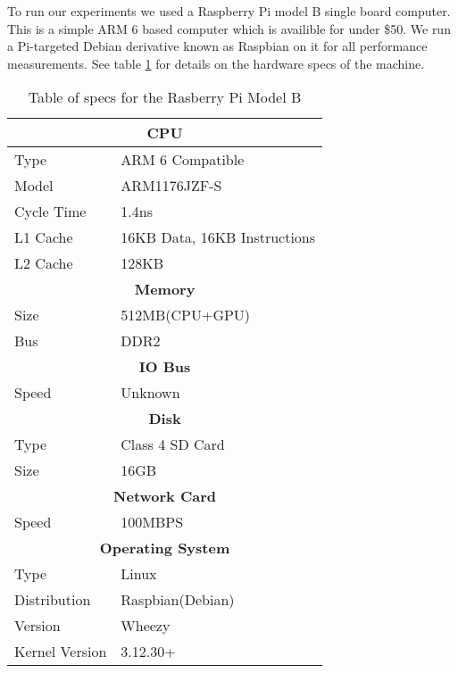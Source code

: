 To run our experiments we used a Raspberry Pi model B single board computer.   
This is a simple ARM 6 based computer which is availible for under \$50.
We run a Pi-targeted Debian derivative known as Raspbian on it for all performance measurements.
See table \ref{tbl:specs} for details on the hardware specs of the machine.

\begin{table}[h]
\centering
\begin{tabular}{|l|l|}
\hline
\multicolumn{2}{|c|}{\textbf{CPU}}              \\ \hline
Type                 & ARM 6 Compatible         \\ \hline
Model                & ARM1176JZF-S             \\ \hline
Cycle Time           & 1.4ns                    \\ \hline
L1 Cache             & 16KB Data, 16KB Instructions          \\ \hline
L2 Cache             & 128KB           \\ \hline
\multicolumn{2}{|c|}{\textbf{Memory}}           \\ \hline
Size                 & 512MB(CPU+GPU)           \\ \hline
Bus                  & DDR2                     \\ \hline
\multicolumn{2}{|c|}{\textbf{IO Bus}}           \\ \hline
Speed                & Unknown                  \\ \hline
\multicolumn{2}{|c|}{\textbf{Disk}}             \\ \hline
Type                 & Class 4 SD Card          \\ \hline
Size                 & 16GB                     \\ \hline
\multicolumn{2}{|c|}{\textbf{Network Card}}     \\ \hline
Speed                & 100MBPS                  \\ \hline
\multicolumn{2}{|c|}{\textbf{Operating System}} \\ \hline
Type                 & Linux                    \\ \hline
Distribution       & Raspbian(Debian)\\ \hline
Version             & Wheezy\\ \hline
Kernel Version  & 3.12.30+ \\\hline
\end{tabular}
\caption{Table of specs for the Rasberry Pi Model B\cite{infosheet}\cite{rpicomp}\cite{elinux}}
\label{tbl:specs}

\end{table}

